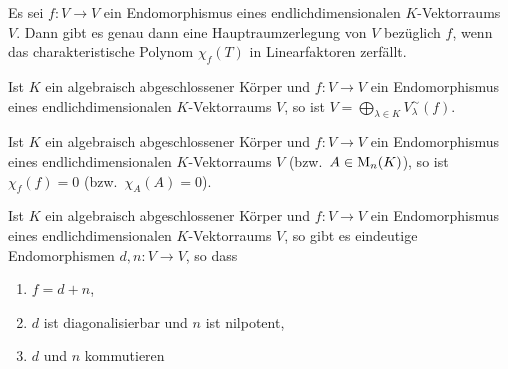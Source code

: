 \begin{theorem}
  Es sei $f \colon V \to V$ ein Endomorphismus eines endlichdimensionalen $K$-Vektorraums $V$.
  Dann gibt es genau dann eine Hauptraumzerlegung von $V$ bezüglich $f$, wenn das charakteristische Polynom $\chi_f(T)$ in Linearfaktoren zerfällt.
\end{theorem}


\begin{corollary}
  Ist $K$ ein algebraisch abgeschlossener Körper und $f \colon V \to V$ ein Endomorphismus eines endlichdimensionalen $K$-Vektorraums $V$, so ist $V = \bigoplus_{\lambda \in K} V^\sim_\lambda(f)$.
\end{corollary}


\begin{corollary}
  Ist $K$ ein algebraisch abgeschlossener Körper und $f \colon V \to V$ ein Endomorphismus eines endlichdimensionalen $K$-Vektorraums $V$ (bzw.\ $A \in \mathrm{M}_n(K)$), so ist $\chi_f(f) = 0$ (bzw.\ $\chi_A(A) = 0$).
\end{corollary}


\begin{corollary}
  Ist $K$ ein algebraisch abgeschlossener Körper und $f \colon V \to V$ ein Endomorphismus eines endlichdimensionalen $K$-Vektorraums $V$, so gibt es eindeutige Endomorphismen $d, n \colon V \to V$, so dass
  \begin{enumerate}[leftmargin=*, label=\alph*)]
    \item
      $f = d + n$,
    \item
      $d$ ist diagonalisierbar und $n$ ist nilpotent,
    \item
      $d$ und $n$ kommutieren
  \end{enumerate}
\end{corollary}



















